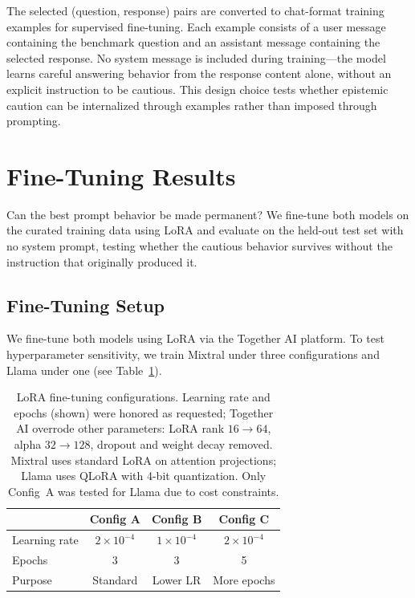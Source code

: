 The selected (question, response) pairs are converted to chat-format training examples for supervised fine-tuning. Each example consists of a user message containing the benchmark question and an assistant message containing the selected response. No system message is included during training---the model learns careful answering behavior from the response content alone, without an explicit instruction to be cautious. This design choice tests whether epistemic caution can be internalized through examples rather than imposed through prompting.

\section{Fine-Tuning Results}
\label{sec:ft-results}

Can the best prompt behavior be made permanent? We fine-tune both models on the curated training data using LoRA and evaluate on the held-out test set with no system prompt, testing whether the cautious behavior survives without the instruction that originally produced it.

\subsection{Fine-Tuning Setup}
\label{sec:ft-setup}

We fine-tune both models using LoRA \citep{hu2022lora} via the Together AI platform. To test hyperparameter sensitivity, we train Mixtral under three configurations and Llama under one (see Table~\ref{tab:ft-lora-configs}).

\begin{table}[ht]
\centering
\small
\begin{tabular}{@{}lccc@{}}
\toprule
& \textbf{Config A} & \textbf{Config B} & \textbf{Config C} \\
\midrule
Learning rate & $2 \times 10^{-4}$ & $1 \times 10^{-4}$ & $2 \times 10^{-4}$ \\
Epochs & 3 & 3 & 5 \\
Purpose & Standard & Lower LR & More epochs \\
\bottomrule
\end{tabular}
\caption{LoRA fine-tuning configurations. Learning rate and epochs (shown) were honored as requested; Together AI overrode other parameters: LoRA rank $16 \to 64$, alpha $32 \to 128$, dropout and weight decay removed. Mixtral uses standard LoRA on attention projections; Llama uses QLoRA with 4-bit quantization. Only Config~A was tested for Llama due to cost constraints.}
\label{tab:ft-lora-configs}
\end{table}

